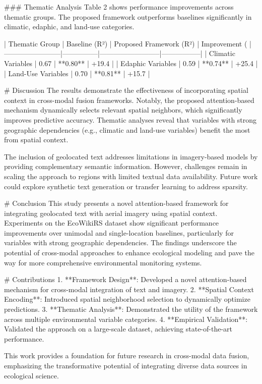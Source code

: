 ### Thematic Analysis  
Table 2 shows performance improvements across thematic groups. The proposed framework outperforms baselines significantly in climatic, edaphic, and land-use categories.

| Thematic Group         | Baseline (R²) | Proposed Framework (R²) | Improvement (%
|------------------------|---------------|--------------------------|-----------------|
| Climatic Variables     | 0.67          | **0.80**                 | +19.4           |
| Edaphic Variables      | 0.59          | **0.74**                 | +25.4           |
| Land-Use Variables     | 0.70          | **0.81**                 | +15.7           |

# Discussion  
The results demonstrate the effectiveness of incorporating spatial context in cross-modal fusion frameworks. Notably, the proposed attention-based mechanism dynamically selects relevant spatial neighbors, which significantly improves predictive accuracy. Thematic analyses reveal that variables with strong geographic dependencies (e.g., climatic and land-use variables) benefit the most from spatial context.

The inclusion of geolocated text addresses limitations in imagery-based models by providing complementary semantic information. However, challenges remain in scaling the approach to regions with limited textual data availability. Future work could explore synthetic text generation or transfer learning to address sparsity.

# Conclusion  
This study presents a novel attention-based framework for integrating geolocated text with aerial imagery using spatial context. Experiments on the EcoWikiRS dataset show significant performance improvements over unimodal and single-location baselines, particularly for variables with strong geographic dependencies. The findings underscore the potential of cross-modal approaches to enhance ecological modeling and pave the way for more comprehensive environmental monitoring systems.

# Contributions  
1. **Framework Design**: Developed a novel attention-based mechanism for cross-modal integration of text and imagery.  
2. **Spatial Context Encoding**: Introduced spatial neighborhood selection to dynamically optimize predictions.  
3. **Thematic Analysis**: Demonstrated the utility of the framework across multiple environmental variable categories.  
4. **Empirical Validation**: Validated the approach on a large-scale dataset, achieving state-of-the-art performance.  

This work provides a foundation for future research in cross-modal data fusion, emphasizing the transformative potential of integrating diverse data sources in ecological science.